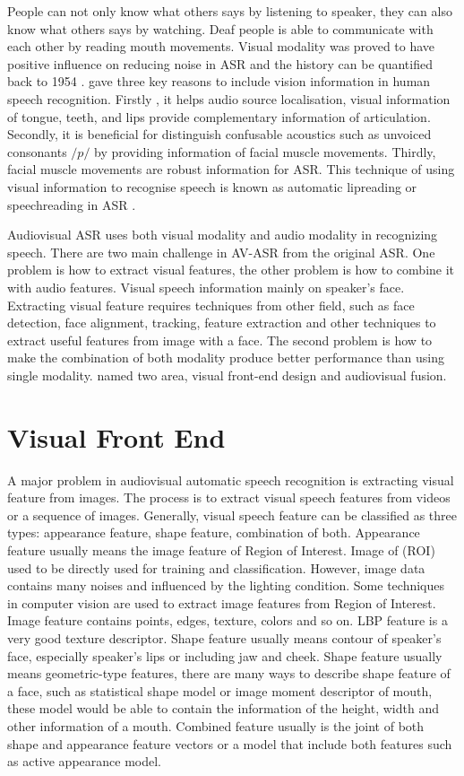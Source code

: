 People can not only know what others says by listening to speaker, they can also know what others says by watching. Deaf people is able to communicate with each other by reading mouth movements. Visual modality was proved to have positive influence on reducing noise in ASR and the history can be quantified back to 1954 \cite{potamianos2003recent}. \cite{potamianos2003recent} gave three key reasons to include vision information in human speech recognition. Firstly , it helps audio source localisation, visual information of tongue, teeth, and lips provide complementary information of articulation. Secondly, it is beneficial for distinguish confusable acoustics such as unvoiced consonants $/p/$ by providing information of facial muscle movements. Thirdly, facial muscle movements are robust information for ASR. This technique of using visual information to recognise speech is known as automatic lipreading or speechreading in ASR \cite{potamianos2003recent}.

Audiovisual ASR uses both visual modality and audio modality in recognizing speech. There are two main challenge in AV-ASR from the original ASR. One problem is how to extract visual features, the other problem is how to combine it with audio features. Visual speech information mainly on speaker's face. Extracting visual feature requires techniques from other field, such as face detection, face alignment, tracking, feature extraction and other techniques to extract useful features from image with a face. The second problem is how to make the combination of both modality produce better performance than using single modality. \cite{potamianos2003recent} named two area, visual front-end design and audiovisual fusion.

\section{Visual Front End}
A major problem in audiovisual automatic speech recognition is extracting visual feature from images. The process is to extract visual speech features from videos or a sequence of images. Generally, visual speech feature can be classified as three types: appearance feature, shape feature, combination of both\cite{potamianos2003recent}. Appearance feature usually means the image feature of Region of Interest. Image of (ROI) used to be directly used for training and classification. However, image data contains many noises and influenced by the lighting condition. Some techniques in computer vision are used to extract image features from Region of Interest. Image feature contains points, edges, texture, colors and so on. LBP feature is a very good texture descriptor. Shape feature usually means contour of speaker's face, especially speaker's lips or including jaw and cheek. Shape feature usually means geometric-type features, there are many ways to describe shape feature of a face, such as statistical shape model or image moment descriptor of mouth, these model would be able to contain the information of the height, width and other information of a mouth. Combined feature usually is the joint of both shape and appearance feature vectors or a model that include both features such as active appearance model.

